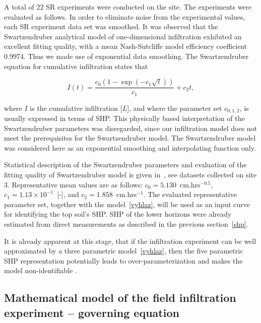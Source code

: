 \documentclass[review,times,3p,twocolumn,10pt]{elsarticle}
\newenvironment{lineq}
    {\begin{linenomath*}
    \begin{equation}
    }
    { 
    \end{equation} 
    \end{linenomath*}
    }
\begin{document}
A total of 22 SR experiments were conducted on the site. The experiments were evaluated as follows. In order to eliminate noise from the experimental values, each SR experiment data set was smoothed. It was observed that the Swartzendruber analytical model \citep{Swartzendruber}
of one-dimensional infiltration exhibited an excellent fitting quality, with a mean  Nash-Sutcliffe model efficiency coefficient  0.9974. Thus we made use of exponential data smoothing. The Swartzendruber equation for cumulative infiltration states that
\begin{lineq}
I(t)=\frac{c_0\left(1-\exp\left(-c_1\sqrt{t}\right)\right)}{c_1}+c_2t,
\label{vyhlaz}
\end{lineq}
where $I$ is the cumulative infiltration [$L$], and where the parameter set $c_{0,1,2}$, is usually expressed in terms of SHP. This physically based interpretation of the Swartzendruber parameters was disregarded, since our infiltration model does not meet the prerequisites for the Swartzendruber model. The Swartzendruber model was considered here as an exponential smoothing and interpolating function only.



 
Statistical description of the Swartzendruber parameters and evaluation of the fitting quality of Swartzendruber model is given in~\citep{jacka-site}, see datasets collected on site 3. Representative mean values are as follows: $c_0 =5.130$~cm.hrs$^{-0.5}$, $c_1 = 1.13 \times 10^{-1}$~[-], and $c_2 = 1.858$~cm.hrs$^{-1}$. The evaluated representative  parameter set, together with the model~\eqref{vyhlaz}, will be used as an input curve for identifying the top soil's SHP. SHP of the lower horizons were already estimated from direct measurements as described in the previous section~\ref{shp}.

It is already apparent at this stage, that if the infiltration experiment can be well approximated by a three parametric model~\eqref{vyhlaz}, then the five parametric SHP representation potentially leads to over-parameterization and makes the model non-identifiable \citep{bellman1970}.  








\subsection{Mathematical model of the field infiltration experiment -- governing equation}%
\label{goveq}
\end{document}
